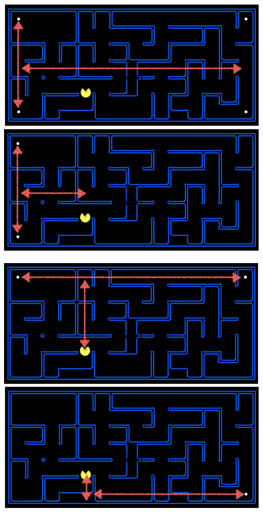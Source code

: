 \documentclass[11pt]{article}
\begin{document}
\begin{center}
\includegraphics[scale=0.5]{corner1}
\includegraphics[scale=0.5]{corner2}\\
\text{}\\
\includegraphics[scale=0.5]{corner3}
\includegraphics[scale=0.5]{corner4}\\
\end{center}
\end{document}
